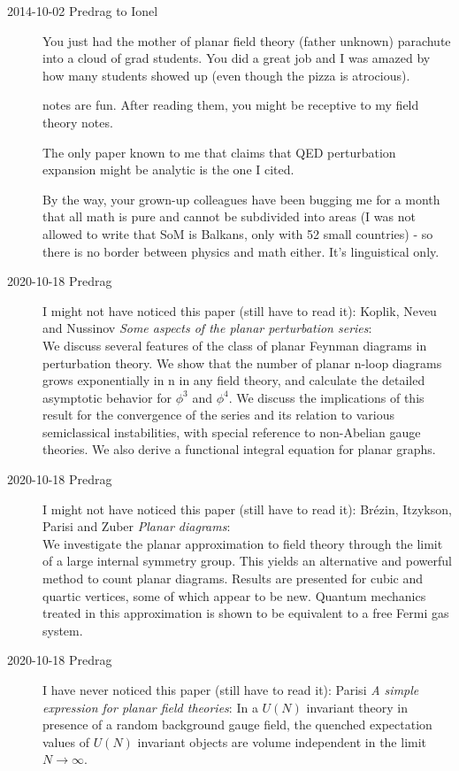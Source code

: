 \begin{description}
\item[2014-10-02 Predrag to Ionel]
 You just had the mother of planar field theory (father unknown)
 parachute into a cloud of grad students. You did a great job and I was
 amazed by how many students showed up (even though the pizza is
 atrocious).

 notes are fun. After reading them, you might be receptive to my
 {field theory notes}.

The only paper known to me that claims that QED perturbation expansion
might be analytic is the one I cited.

By the way, your grown-up colleagues have been bugging me for a month
that all math is pure and cannot be subdivided into areas (I was not
allowed to write that SoM is Balkans, only with 52 small countries) - so
there is no border between physics and math either. It's linguistical
only.

\item[2020-10-18 Predrag]
I might not have noticed this paper (still have to read it):
Koplik, Neveu and Nussinov
{{\em Some aspects of the planar perturbation series}}:\\
We discuss several features of the class of planar Feynman diagrams in
perturbation theory. We show that the number of planar n-loop diagrams
grows exponentially in n in any field theory, and calculate the detailed
asymptotic behavior for $\phi^3$ and $\phi^4$. We discuss the
implications of this result for the convergence of the series and its
relation to various semiclassical instabilities, with special reference
to non-Abelian gauge theories. We also derive a functional integral
equation for planar graphs.

\item[2020-10-18 Predrag]
I might not have noticed this paper (still have to read it):
Br{\'{e}}zin, Itzykson, Parisi and Zuber
{{\em Planar diagrams}}:\\
We investigate the planar approximation to field theory through the limit
of a large internal symmetry group. This yields an alternative and
powerful method to count planar diagrams. Results are presented for cubic
and quartic vertices, some of which appear to be new. Quantum mechanics
treated in this approximation is shown to be equivalent to a free Fermi
gas system.

\item[2020-10-18 Predrag]
I have never noticed this paper (still have to read it):
Parisi
{{\em A simple expression for planar field theories}}:
In a $U(N)$ invariant theory in presence of a random background gauge
field, the quenched expectation values of $U(N)$ invariant objects are
volume independent in the limit $N\to\infty$.


\end{description}
